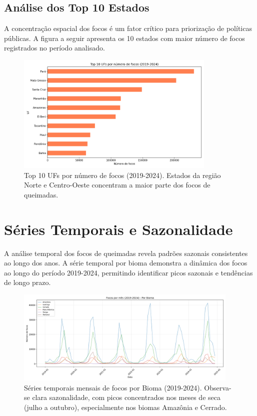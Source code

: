 \documentclass[12pt,a4paper]{report}
\begin{document}
\subsection{Análise dos Top 10 Estados}

A concentração espacial dos focos é um fator crítico para priorização de políticas públicas. A figura a seguir apresenta os 10 estados com maior número de focos registrados no período analisado.

\begin{figure}[h]
\centering
\includegraphics[width=0.85\textwidth]{../figs/eda/top10_uf.png}
\caption{Top 10 UFs por número de focos (2019-2024). Estados da região Norte e Centro-Oeste concentram a maior parte dos focos de queimadas.}
\label{fig:top10_uf}
\end{figure}

\section{Séries Temporais e Sazonalidade}

A análise temporal dos focos de queimadas revela padrões sazonais consistentes ao longo dos anos. A série temporal por bioma demonstra a dinâmica dos focos ao longo do período 2019-2024, permitindo identificar picos sazonais e tendências de longo prazo.

\begin{figure}[h]
\centering
\includegraphics[width=0.95\textwidth]{../figs/eda/series_bioma.png}
\caption{Séries temporais mensais de focos por Bioma (2019-2024). Observa-se clara sazonalidade, com picos concentrados nos meses de seca (julho a outubro), especialmente nos biomas Amazônia e Cerrado.}
\label{fig:series_bioma}
\end{figure}
\end{document}
